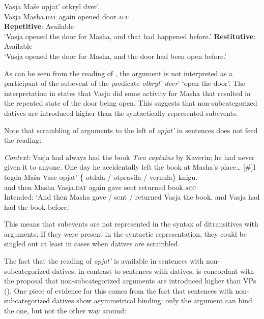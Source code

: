 \documentclass[output=paper]{langscibook}
\begin{document}
 \ea\label{ex:bondarenko:32}
\gll Vasja Maše opjat’ otkryl dver’.\\
     Vasja Masha.\textsc{dat} again opened door.\textsc{acc}\\
\ea \textbf{Repetitive}: Available\\
`Vasja opened the door for Masha, and that had happened   before.'
\ex \textbf{Restitutive}: Available\label{ex:bondarenko:32b}\\
`Vasja opened the door for Masha, and the door had been open   before.'
\z\z


\noindent As can be seen from the  reading of , the  argument is not interpreted as a participant of the  subevent of the predicate \textit{otkryt}’ \textit{dver}’ ‘open the door’. The interpretation in  states that Vasja did some activity for Masha that resulted in the repeated state of the door being open. This suggests that non-subcategorized datives are introduced higher than the syntactically represented  subevents.



Note that scrambling of  arguments to the left of \textit{opjat’} in  sentences does not feed the  reading:


 \ea\label{ex:bondarenko:33}
\textit{Context:} Vasja had always had the book \textit{Two captains} by Kaverin; he had never given it to anyone. One day he accidentally left the book at Masha’s place\dots
\exi{}[\#]{\gll I togda Maša Vase opjat’ \{\hspace{-2pt} otdala / otpravila / vernula\} knigu.\\
     and then Masha Vasja.\textsc{dat} again {} gave {} sent {} returned book.\textsc{acc}\\
\glt Intended: `And then Masha gave / sent / returned Vasja the book, and Vasja had had the book before.'}
\z

\noindent This means that  subevents are not represented in the syntax of ditransitives with  arguments. If they were present in the syntactic representation, they could be singled out at least in cases when datives are scrambled.


\largerpage[2]
The fact that the  reading of \textit{opjat’} is available in sentences with non-subcategorized datives, in contrast to  sentences with datives, is concordant with the proposal that non-subcategorized  arguments are introduced higher than VPs (\citealt{Boneh-Nash2017}). One piece of evidence for this comes from the fact that sentences with non-subcategorized datives show asymmetrical binding: only the  argument can bind the  one, but not the other way around:\largerpage
\end{document}
